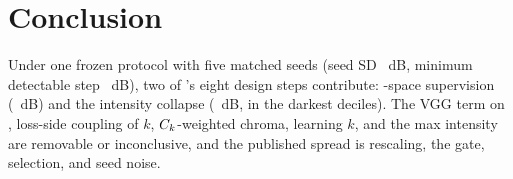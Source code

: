 \section{Conclusion}
\label{sec:conclusion}

Under one frozen protocol with five matched seeds (seed SD ~dB, minimum detectable
step ~dB), two of \mname's eight design steps contribute: \hvi-space supervision
(~dB) and the intensity collapse (~dB, in the darkest deciles). The VGG term on \hvi, loss-side coupling of $k$, $C_k$-weighted chroma, learning $k$, and
the max intensity are removable or inconclusive, and the published spread is rescaling, the gate, selection, and seed noise.
